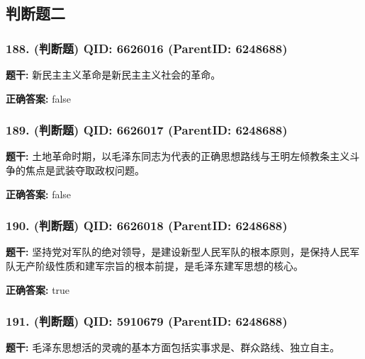 \documentclass[12pt,UTF8]{ctexart}
\begin{document}
\subsection*{判断题二}

\subsubsection*{188. (判断题) \small QID: 6626016 (ParentID: 6248688)}

\textbf{题干:}
新民主主义革命是新民主主义社会的革命。



\textbf{正确答案:}
false

\vspace{0.3em}\hrulefill\vspace{0.7em}

\subsubsection*{189. (判断题) \small QID: 6626017 (ParentID: 6248688)}

\textbf{题干:}
土地革命时期，以毛泽东同志为代表的正确思想路线与王明左倾教条主义斗争的焦点是武装夺取政权问题。



\textbf{正确答案:}
false

\vspace{0.3em}\hrulefill\vspace{0.7em}

\subsubsection*{190. (判断题) \small QID: 6626018 (ParentID: 6248688)}

\textbf{题干:}
坚持党对军队的绝对领导，是建设新型人民军队的根本原则，是保持人民军队无产阶级性质和建军宗旨的根本前提，是毛泽东建军思想的核心。



\textbf{正确答案:}
true

\vspace{0.3em}\hrulefill\vspace{0.7em}

\subsubsection*{191. (判断题) \small QID: 5910679 (ParentID: 6248688)}

\textbf{题干:}
毛泽东思想活的灵魂的基本方面包括实事求是、群众路线、独立自主。
\end{document}
